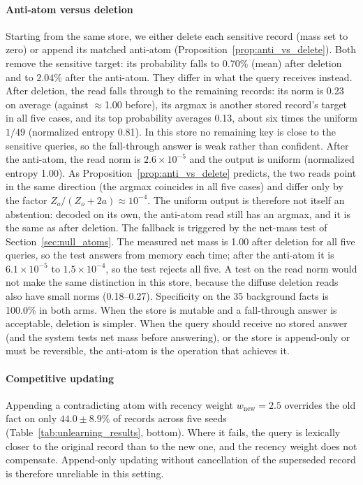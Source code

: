 \documentclass[preprint,12pt]{elsarticle}
\newif\ifmarkchanges
\newcommand{\revii}[1]{\ifmarkchanges{\color{blue}#1}\else#1\fi} %
\providecommand{\DIFaddbegin}{} %
\providecommand{\DIFaddend}{} %
\providecommand{\DIFaddincludegraphics}[2][]{{\color{blue}\fbox{\DIFOincludegraphics[#1]{#2}}}} %
\DeclareRobustCommand{\DIFaddbegin}{\DIFOaddbegin \let\includegraphics\DIFaddincludegraphics} %
\DeclareRobustCommand{\DIFaddend}{\DIFOaddend \let\includegraphics\DIFOincludegraphics} %
\begin{document}
\paragraph{Anti-atom versus deletion}
Starting from the same store, we either delete each sensitive record (mass set to zero) or append its matched anti-atom (Proposition~\ref{prop:anti_vs_delete}). Both remove the sensitive target: its probability falls to 0.70\% (mean) after deletion and to $2.04\%$ after the anti-atom. They differ in what the query receives instead. After deletion, the read falls through to the remaining records: its norm is 0.23 on average (against $\approx$1.00 before), its argmax is another stored record's target in all five cases, and its top probability averages 0.13, about six times the uniform $1/49$ (normalized entropy 0.81). In this store no remaining key is close to the sensitive queries, so the fall-through answer is weak rather than confident. After the anti-atom, the read norm is $2.6\times10^{-5}$ and the output is uniform (normalized entropy 1.00). As Proposition~\ref{prop:anti_vs_delete} predicts, the two reads point in the same direction (the argmax coincides in all five cases) and differ only by the factor $Z_o/(Z_o+2a)\approx10^{-4}$. \DIFaddbegin \revii{The uniform output is therefore not itself an abstention: decoded on its own, the anti-atom read still has an argmax, and it is the same as after deletion. The fallback is triggered by the net-mass test of Section~\ref{sec:null_atoms}. The measured net mass is 1.00 after deletion for all five queries, so the test answers from memory each time; after the anti-atom it is $6.1\times10^{-5}$ to $1.5\times10^{-4}$, so the test rejects all five. A test on the read norm would not make the same distinction in this store, because the diffuse deletion reads also have small norms (0.18--0.27).} \DIFaddend Specificity on the 35 background facts is 100.0\% in both arms. When the store is mutable and a fall-through answer is acceptable, deletion is simpler. When the query should receive no stored answer \DIFaddbegin \revii{(and the system tests net mass before answering)}\DIFaddend , or the store is append-only or must be reversible, the anti-atom is the operation that achieves it.

\paragraph{Competitive updating}
Appending a contradicting atom with recency weight $w_{\mathrm{new}} = 2.5$ overrides the old fact on only $44.0\pm8.9\%$ of records across five seeds (Table~\ref{tab:unlearning_results}, bottom). Where it fails, the query is lexically closer to the original record than to the new one, and the recency weight does not compensate. Append-only updating without cancellation of the superseded record is therefore unreliable in this setting.
\end{document}
